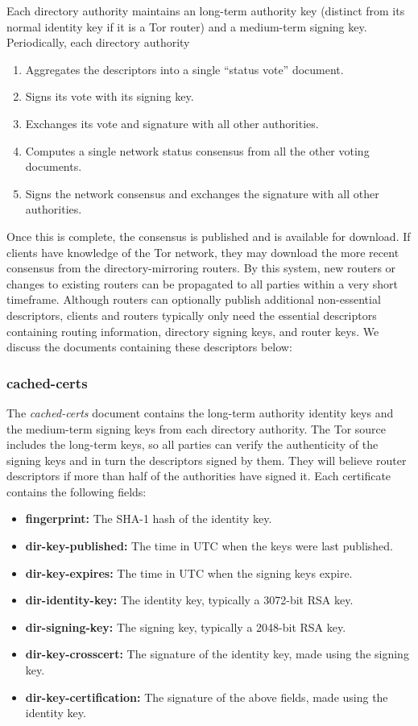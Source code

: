 Each directory authority maintains an long-term authority key (distinct from its normal identity key if it is a Tor router) and a medium-term signing key. Periodically, each directory authority 

\begin{enumerate}
	\item Aggregates the descriptors into a single ``status vote'' document.
	\item Signs its vote with its signing key.
	\item Exchanges its vote and signature with all other authorities.
	\item Computes a single network status consensus from all the other voting documents.
	\item Signs the network consensus and exchanges the signature with all other authorities.
\end{enumerate}

Once this is complete, the consensus is published and is available for download. If clients have knowledge of the Tor network, they may download the more recent consensus from the directory-mirroring routers. By this system, new routers or changes to existing routers can be propagated to all parties within a very short timeframe. Although routers can optionally publish additional non-essential descriptors, clients and routers typically only need the essential descriptors containing routing information, directory signing keys, and router keys. We discuss the documents containing these descriptors below:\cite{TorCollector}\cite{TorDirSpec}

\subsubsection{cached-certs}

The \emph{cached-certs} document contains the long-term authority identity keys and the medium-term signing keys from each directory authority. The Tor source includes the long-term keys, so all parties can verify the authenticity of the signing keys and in turn the descriptors signed by them. They will believe router descriptors if more than half of the authorities have signed it. Each certificate contains the following fields:

\begin{itemize}
	\item \textbf{fingerprint:} The SHA-1 hash of the identity key.
	\item \textbf{dir-key-published:} The time in UTC when the keys were last published.
	\item \textbf{dir-key-expires:} The time in UTC when the signing keys expire.
	\item \textbf{dir-identity-key:} The identity key, typically a 3072-bit RSA key.
	\item \textbf{dir-signing-key:} The signing key, typically a 2048-bit RSA key.
	\item \textbf{dir-key-crosscert:} The signature of the identity key, made using the signing key.
	\item \textbf{dir-key-certification:} The signature of the above fields, made using the identity key.	
\end{itemize}

